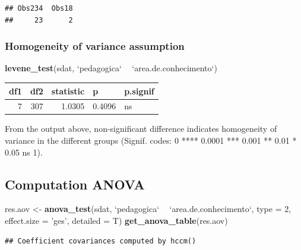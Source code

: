 \documentclass[]{article}
\newenvironment{Shaded}{\begin{snugshade}}{\end{snugshade}}
\newcommand{\DataTypeTok}[1]{\textcolor[rgb]{0.13,0.29,0.53}{#1}}
\newcommand{\DecValTok}[1]{\textcolor[rgb]{0.00,0.00,0.81}{#1}}
\newcommand{\KeywordTok}[1]{\textcolor[rgb]{0.13,0.29,0.53}{\textbf{#1}}}
\newcommand{\NormalTok}[1]{#1}
\newcommand{\OperatorTok}[1]{\textcolor[rgb]{0.81,0.36,0.00}{\textbf{#1}}}
\newcommand{\StringTok}[1]{\textcolor[rgb]{0.31,0.60,0.02}{#1}}
\begin{document}
\begin{verbatim}
## Obs234  Obs18 
##     23      2
\end{verbatim}

\hypertarget{homogeneity-of-variance-assumption}{%
\subsubsection{Homogeneity of variance
assumption}\label{homogeneity-of-variance-assumption}}

\begin{Shaded}
\begin{Highlighting}[]
\KeywordTok{levene_test}\NormalTok{(sdat, }\StringTok{`}\DataTypeTok{pedagogica}\StringTok{`} \OperatorTok{~}\StringTok{ `}\DataTypeTok{area.de.conhecimento}\StringTok{`}\NormalTok{)}
\end{Highlighting}
\end{Shaded}

\begin{longtable}[]{@{}rrrll@{}}
\toprule
df1 & df2 & statistic & p & p.signif\tabularnewline
\midrule
\endhead
7 & 307 & 1.0305 & 0.4096 & ns\tabularnewline
\bottomrule
\end{longtable}

From the output above, non-significant difference indicates homogeneity
of variance in the different groups (Signif. codes: 0 **** 0.0001 ***
0.001 ** 0.01 * 0.05 ns 1).

\hypertarget{computation-anova}{%
\subsection{Computation ANOVA}\label{computation-anova}}

\begin{Shaded}
\begin{Highlighting}[]
\NormalTok{res.aov <-}\StringTok{ }\KeywordTok{anova_test}\NormalTok{(sdat, }\StringTok{`}\DataTypeTok{pedagogica}\StringTok{`} \OperatorTok{~}\StringTok{ `}\DataTypeTok{area.de.conhecimento}\StringTok{`}\NormalTok{, }\DataTypeTok{type =} \DecValTok{2}\NormalTok{, }\DataTypeTok{effect.size =} \StringTok{'ges'}\NormalTok{, }\DataTypeTok{detailed =}\NormalTok{ T)}
\KeywordTok{get_anova_table}\NormalTok{(res.aov)}
\end{Highlighting}
\end{Shaded}

\begin{verbatim}
## Coefficient covariances computed by hccm()
\end{verbatim}
\end{document}
